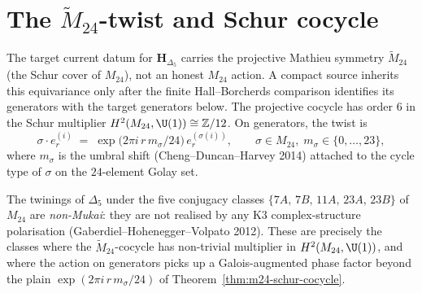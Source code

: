 \section{The \texorpdfstring{$\widetilde{M}_{24}$}{widetildeM-24}-twist and Schur cocycle}
\label{sec:m24-twist}

\begin{theorem}
\label{thm:m24-schur-cocycle}
The target current datum for $\mathbf{H}_{\Delta_5}$ carries the
projective Mathieu symmetry $\widetilde{M}_{24}$ (the Schur cover of
$M_{24}$), not an honest $M_{24}$ action.  A compact source inherits this
equivariance only after the finite Hall--Borcherds comparison identifies
its generators with the target generators below.
The projective cocycle has order $6$ in the Schur multiplier
$H^2(M_{24},\U(1))\cong \mathbb{Z}/12$. On generators, the twist is
\[
 \sigma\cdot e^{(i)}_r
 \;=\;
 \exp\!\bigl(2\pi i\, r\, m_\sigma/24\bigr)\, e^{(\sigma(i))}_r,
 \qquad
 \sigma\in M_{24},\;
 m_\sigma\in\{0,\dots,23\},
\]
where $m_\sigma$ is the umbral shift (Cheng--Duncan--Harvey 2014) attached to the
cycle type of $\sigma$ on the $24$-element Golay set.
\end{theorem}

\begin{remark}
\label{rem:anomalous-M24-classes}
The twinings of $\Delta_5$ under the five conjugacy classes
$\{7A,\, 7B,\, 11A,\, 23A,\, 23B\}$ of $M_{24}$ are \emph{non-Mukai}: they are not
realised by any K3 complex-structure polarisation (Gaberdiel--Hohenegger--Volpato 2012).
These are precisely the classes where the $\widetilde{M}_{24}$-cocycle has
non-trivial multiplier in $H^2(M_{24},\U(1))$, and where the action on generators
picks up a Galois-augmented phase factor beyond the plain $\exp(2\pi i\,r\,m_\sigma/24)$
of Theorem~\ref{thm:m24-schur-cocycle}.
\end{remark}

